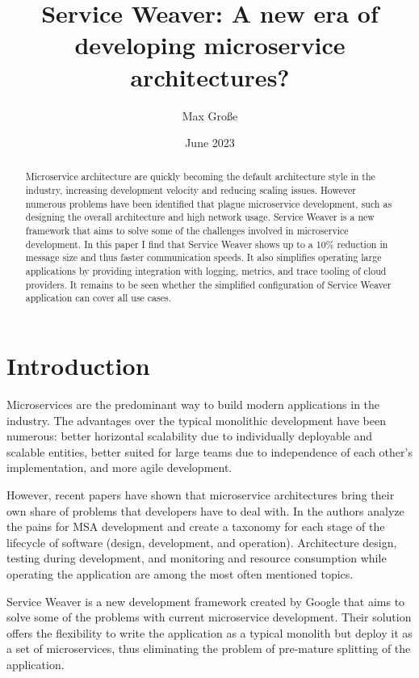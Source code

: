 \documentclass[sigconf,review,9pt]{acmart}
\title{Service Weaver: A new era of developing microservice architectures?}
\author{Max Große}
\date{June 2023}
\begin{document}
\begin{abstract}
	Microservice architecture are quickly becoming the default architecture style
	in the industry, increasing development velocity and reducing scaling issues.
	However numerous problems have been identified that plague microservice development,
	such as designing the overall architecture and high network usage.
	Service Weaver is a new framework that aims to solve some of the challenges involved
	in microservice development.
	In this paper I find that Service Weaver shows up to a 10\% reduction in message size
	and thus faster communication speeds.
	It also simplifies operating large applications by providing integration with
	logging, metrics, and trace tooling of cloud providers.
	It remains to be seen whether the simplified configuration of Service Weaver application
	can cover all use cases.
\end{abstract}

\maketitle

\section{Introduction}
Microservices are the predominant way to build modern applications in the industry. \cite{wang_ms_current_situation}
The advantages over the typical monolithic development have been numerous:
better horizontal scalability due to individually deployable and scalable entities,
better suited for large teams due to independence of each other's implementation,
and more agile development.

However, recent papers have shown that microservice architectures bring their own share
of problems that developers have to deal with.
In \cite{soldani_pains_gains} the authors analyze the pains for MSA development
and create a taxonomy for each stage of the lifecycle of software (design, development, and operation).
Architecture design, testing during development, and monitoring and resource consumption
while operating the application are among the most often mentioned topics.

Service Weaver is a new development framework created by Google that aims to solve some of
the problems with current microservice development.
Their solution offers the flexibility to write the application as a typical monolith
but deploy it as a set of microservices, thus eliminating the problem of pre-mature
splitting of the application.
\end{document}
